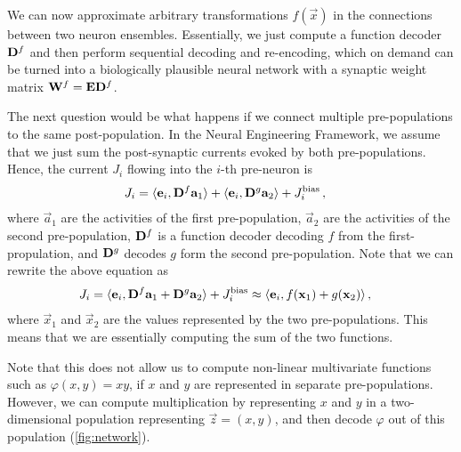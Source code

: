 \documentclass[10pt,letterpaper,oneside]{article}
\begin{document}
	We can now approximate arbitrary transformations $f(\vec x)$ in the connections between two neuron ensembles. Essentially, we just compute a function decoder ${\mathbf{D}}^f$ and then perform sequential decoding and re-encoding, which on demand can be turned into a biologically plausible neural network with a synaptic weight matrix ${\mathbf{W}}^f = {\mathbf{E}} {\mathbf{D}}^f$.

	The next question would be what happens if we connect multiple pre-populations to the same post-population. In the Neural Engineering Framework, we assume that we just sum the post-synaptic currents evoked by both pre-populations. Hence, the current $J_i$ flowing into the $i$-th pre-neuron is
	\begin{align*}
		J_i &= \langle {\mathbf{e}}_i, {\mathbf{D}}^f {\mathbf{a}}_1 \rangle + \langle {\mathbf{e}}_i, {\mathbf{D}}^g {\mathbf{a}}_2 \rangle + J^\mathrm{bias}_i \,,
	\end{align*}
	where $\vec a_1$ are the activities of the first pre-population, $\vec a_2$ are the activities of the second pre-population, ${\mathbf{D}}^f$ is a function decoder decoding $f$ from the first-propulation, and ${\mathbf{D}}^g$ decodes $g$ form the second pre-population. Note that we can rewrite the above equation as
	\begin{align*}
		J_i &= \langle {\mathbf{e}}_i, {\mathbf{D}}^f {\mathbf{a}}_1 + {\mathbf{D}}^g {\mathbf{a}}_2 \rangle + J^\mathrm{bias}_i \approx \langle {\mathbf{e}}_i, f({\mathbf{x}}_1) + g({\mathbf{x}}_2) \rangle \,,
	\end{align*}
	where $\vec x_1$ and $\vec x_2$ are the values represented by the two pre-populations. This means that we are essentially computing the sum of the two functions.

	Note that this does not allow us to compute non-linear multivariate functions such as $\varphi(x, y) = xy$, if $x$ and $y$ are represented in separate pre-populations. However, we can compute multiplication by representing $x$ and $y$ in a two-dimensional population representing $\vec z = (x, y)$, and then decode $\varphi$ out of this population (\cref{fig:network}).
	\printbibliography
	
\end{document}
